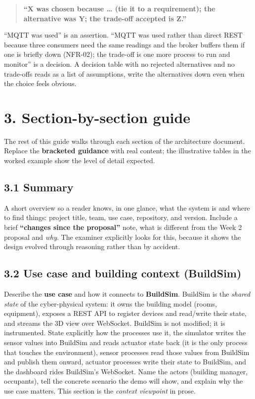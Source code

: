 \documentclass[
  11pt,
]{article}
\begin{document}
\begin{quote}
\textbf{``X was chosen because \ldots{} (tie it to a requirement); the alternative was Y; the trade-off accepted is Z.''}
\end{quote}

``MQTT was used'' is an assertion. ``MQTT was used rather than direct REST
because three consumers need the same readings and the broker buffers
them if one is briefly down (NFR-02); the trade-off is one more process
to run and monitor'' is a decision. A decision table with no rejected
alternatives and no trade-offs reads as a list of assumptions, write
the alternatives down even when the choice feels obvious.

\hypertarget{section-by-section-guide}{%
\section{3. Section-by-section guide}\label{section-by-section-guide}}

The rest of this guide walks through each section of the architecture
document. Replace the \textbf{bracketed guidance} with real content;
the illustrative tables in the worked example show the level of detail
expected.

\hypertarget{summary}{%
\subsection{3.1 Summary}\label{summary}}

A short overview so a reader knows, in one glance, what the system is
and where to find things: project title, team, use case, repository, and
version. Include a brief \textbf{``changes since the proposal''} note, what is different from the Week 2 proposal and \emph{why}. The examiner explicitly looks for this, because it shows the design evolved
through reasoning rather than by accident.

\hypertarget{use-case-and-building-context-buildsim}{%
\subsection{3.2 Use case and building context
(BuildSim)}\label{use-case-and-building-context-buildsim}}

Describe the \textbf{use case} and how it connects to \textbf{BuildSim}.
BuildSim is the \emph{shared state} of the cyber-physical system: it
owns the building model (rooms, equipment), exposes a REST API to
register devices and read/write their state, and streams the 3D view
over WebSocket. BuildSim is not modified; it is instrumented. State explicitly how the processes use it, the simulator writes the sensor
values into BuildSim and reads actuator state back (it is the only
process that touches the environment), sensor processes read those values
from BuildSim and publish them onward, actuator processes write their
state to BuildSim, and the dashboard rides BuildSim's WebSocket. Name the actors (building manager,
occupants), tell the concrete scenario the demo will show, and explain
why the use case matters. This section is the \emph{context viewpoint}
in prose.
\end{document}
